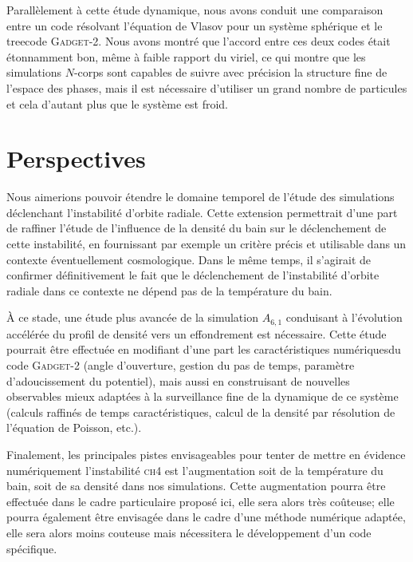 Parallèlement à cette étude dynamique, nous avons conduit une
comparaison entre un code résolvant l'équation de Vlasov pour un
système sphérique et le treecode \textsc{Gadget-2}. Nous avons montré que
l'accord entre ces deux codes était étonnamment bon, même à
faible rapport du viriel,
ce qui montre que les simulations $N$-corps sont capables de suivre avec précision la
structure fine
de l'espace des phases, mais il est nécessaire d'utiliser un grand nombre de particules et cela d'autant plus que le système est froid.


\section{Perspectives}


Nous aimerions pouvoir étendre le domaine temporel de l'étude des
simulations déclenchant l'instabilité d'orbite radiale. Cette
extension permettrait d'une part de raffiner l'étude de l'influence de la
densité du bain sur le déclenchement de cette instabilité, en
fournissant par exemple un critère précis et utilisable dans un
contexte éventuellement cosmologique. Dans le même temps, il s'agirait
de confirmer définitivement le fait que le déclenchement
de l'instabilité d'orbite radiale dans ce contexte ne dépend pas de la
température du bain.



À ce stade, une étude plus avancée de la simulation $A_{6,1}$
conduisant à l'évolution accélérée du profil de
densité vers un effondrement est nécessaire.  Cette étude pourrait
être effectuée en modifiant d'une part les caractéristiques
\og{}numériques\fg du code \textsc{Gadget-2} (angle d'ouverture, gestion du pas de temps,
paramètre d'adoucissement du potentiel), mais aussi en construisant de
nouvelles observables mieux adaptées à la surveillance fine de la
dynamique de ce système (calculs raffinés de temps
caractéristiques, calcul de la densité par résolution de
l'équation de Poisson, etc.).


Finalement, les principales pistes envisageables pour tenter de
mettre en évidence numériquement l'instabilité \textsc{ch4}  est
l'augmentation soit de la température du bain, soit de sa densité dans nos simulations. Cette
augmentation pourra être effectuée dans le cadre particulaire
proposé ici, elle sera alors très coûteuse; elle pourra également
être envisagée dans le cadre d'une méthode numérique
adaptée, elle sera alors moins couteuse mais nécessitera le
développement d'un code spécifique.

